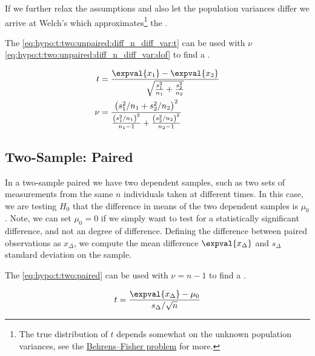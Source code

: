 If we further relax the assumptions and also let the population variances differ
we arrive at Welch's \ttest which approximates\footnote{The
true distribution of $t$ depends somewhat on the unknown population variances,
see the \href{https://en.wikipedia.org/wiki/Behrens\%E2\%80\%93Fisher_problem}{Behrens--Fisher problem}
for more.} the \tdist.

The \tstat \cref{eq:hypo:t:two:unpaired:diff_n_diff_var:t} can be used with $\nu$ \cref{eq:hypo:t:two:unpaired:diff_n_diff_var:dof} to find a \pvalue.

\begin{subequations}\label{eq:hypo:t:two:unpaired:diff_n_diff_var}
\begin{align}
t &= \frac{\expval{x_{1}} - \expval{x_{2}}}{\sqrt{\frac{s^{2}_{1}}{n_{1}} + \frac{s^{2}_{2}}{n_{2}}}} \label{eq:hypo:t:two:unpaired:diff_n_diff_var:t} \\
\nu &= \frac{\left(s^{2}_{1}/n_{1} + s^{2}_{2}/n_{2}\right)^{2}}{\frac{\left(s^{2}_{1}/n_{1}\right)^{2}}{n_{1}-1} + \frac{\left(s^{2}_{2}/n_{2}\right)^{2}}{n_{2}-1}} \label{eq:hypo:t:two:unpaired:diff_n_diff_var:dof}
\end{align}
\end{subequations}

\subsection{Two-Sample: Paired}
\label{hypo:t_test:two:paired}

In a two-sample paired \ttest we have two dependent samples,
such as two sets of measurements from the same $n$ individuals taken at different times.
In this case, we are testing $H_{0}$ that the difference in means of the two dependent samples is $\mu_{0}$.
Note, we can set $\mu_{0} = 0$ if we simply want to test for a statistically significant difference, and not an \apriori degree of difference.
Defining the difference between paired observations as $x_{\Delta}$, we compute the mean difference $\expval{x_{\Delta}}$ and $s_{\Delta}$ standard deviation on the sample.

The \tstat \cref{eq:hypo:t:two:paired} can be used with $\nu = n-1$ to find a \pvalue.

\begin{equation}\label{eq:hypo:t:two:paired}
t = \frac{\expval{x_{\Delta}} - \mu_{0}}{s_{\Delta} / \sqrt{n}}
\end{equation}

